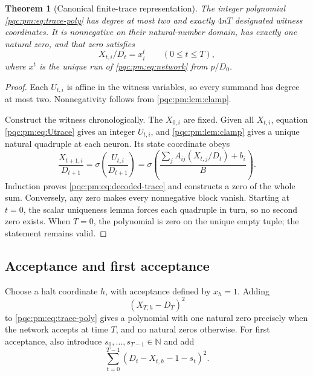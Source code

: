 \documentclass[11pt,letterpaper]{article}
\numberwithin{equation}{section}
\newtheorem{theorem}{Theorem}[section]
\theoremstyle{definition}
\theoremstyle{remark}
\newcommand{\N}{\mathbb N}
\begin{document}
\begin{theorem}[Canonical finite-trace representation]\label{pqc:pm:thm:trace}
The integer polynomial \eqref{pqc:pm:eq:trace-poly} has degree at most two and exactly
$4nT$ designated witness coordinates. It is nonnegative on their natural-number
domain, has exactly one natural zero, and that zero satisfies
\begin{equation}\label{pqc:pm:eq:decoded-trace}
 X_{t,i}/D_t=x^t_i\qquad(0\leq t\leq T),
\end{equation}
where $x^t$ is the unique run of \eqref{pqc:pm:eq:network} from $p/D_0$.
\end{theorem}

\begin{proof}
Each $U_{t,i}$ is affine in the witness variables, so every summand has degree
at most two. Nonnegativity follows from \cref{pqc:pm:lem:clamp}.

Construct the witness chronologically. The $X_{0,i}$ are fixed. Given all
$X_{t,i}$, equation \eqref{pqc:pm:eq:Utrace} gives an integer $U_{t,i}$, and
\cref{pqc:pm:lem:clamp} gives a unique natural quadruple at each neuron. Its state
coordinate obeys
\[
 \frac{X_{t+1,i}}{D_{t+1}}
 =\sigma\left(\frac{U_{t,i}}{D_{t+1}}\right)
 =\sigma\left(\frac{\sum_j A_{ij}(X_{t,j}/D_t)+b_i}{B}\right).
\]
Induction proves \eqref{pqc:pm:eq:decoded-trace} and constructs a zero of the whole
sum. Conversely, any zero makes every nonnegative block vanish. Starting at
$t=0$, the scalar uniqueness lemma forces each quadruple in turn, so no second
zero exists. When $T=0$, the polynomial is zero on the unique empty tuple;
the statement remains valid.
\end{proof}

\subsection{Acceptance and first acceptance}

Choose a halt coordinate $h$, with acceptance defined by $x_h=1$. Adding
\begin{equation}\label{pqc:pm:eq:accept}
 (X_{T,h}-D_T)^2
\end{equation}
to \eqref{pqc:pm:eq:trace-poly} gives a polynomial with one natural zero precisely
when the network accepts at time $T$, and no natural zeros otherwise.
For first acceptance, also introduce $s_0,\ldots,s_{T-1}\in\N$ and add
\begin{equation}\label{pqc:pm:eq:first-hit}
 \sum_{t=0}^{T-1}(D_t-X_{t,h}-1-s_t)^2.
\end{equation}
\end{document}
